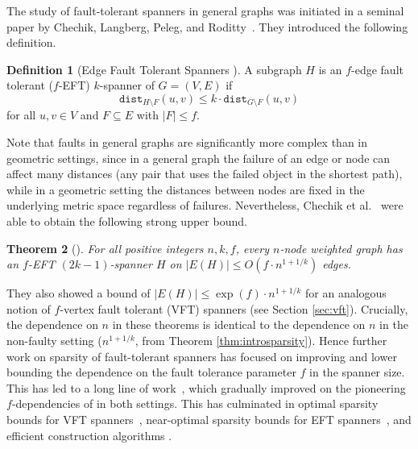 \documentclass{article}
\theoremstyle{plain}
\newtheorem{theorem}{Theorem}
\theoremstyle{definition}
\newtheorem{definition}[theorem]{Definition}
\newcommand{\dist}{\texttt{dist}}
\begin{document}
The study of fault-tolerant spanners in general graphs was initiated in a seminal paper by Chechik, Langberg, Peleg, and Roditty~\cite{CLPR10}.  They introduced the following definition.

\begin{definition} [Edge Fault Tolerant Spanners \cite{CLPR10}] \label{def:FT}
A subgraph $H$ is an $f$-edge fault tolerant ($f$-EFT) $k$-spanner of $G = (V, E)$ if
$$\dist_{H \setminus F}(u,v) \leq k \cdot \dist_{G \setminus F}(u,v)$$
for all $u,v \in V$ and $F \subseteq E$ with $|F| \leq f$.
\end{definition}

Note that faults in general graphs are significantly more complex than in geometric settings, since in a general graph the failure of an edge or node can affect many distances (any pair that uses the failed object in the shortest path), while in a geometric setting the distances between nodes are fixed in the underlying metric space regardless of failures.  Nevertheless, Chechik et al.~\cite{CLPR10} were able to obtain the following strong upper bound.  

\begin{theorem} [\cite{CLPR10}]
For all positive integers $n, k, f$, every $n$-node weighted graph has an $f$-EFT $(2k-1)$-spanner $H$ on $|E(H)| \le O(f \cdot n^{1+1/k})$ edges. 
\end{theorem}

They also showed a bound of $|E(H)| \le \exp(f) \cdot n^{1+1/k}$ for an analogous notion of $f$-vertex fault tolerant (VFT) spanners (see Section \ref{sec:vft}).
Crucially, the dependence on $n$ in these theorems is identical to the dependence on $n$ in the non-faulty setting ($n^{1+1/k}$, from Theorem \ref{thm:introsparsity}).  Hence further work on sparsity of fault-tolerant spanners has focused on improving and lower bounding the dependence on the fault tolerance parameter $f$ in the spanner size.
This has led to a long line of work~\cite{CLPR10, DK11podc,BDPV18,BP19,DR20,BDR21,BDR22,Parter22, BHP24, PST24}, which gradually improved on the pioneering $f$-dependencies of \cite{CLPR10} in both settings.
This has culminated in optimal sparsity bounds for VFT spanners~\cite{BP19,BDR21}, near-optimal sparsity bounds for EFT spanners~\cite{BDR22}, and efficient construction algorithms \cite{DR20, BDR21, Parter22}.
\end{document}
